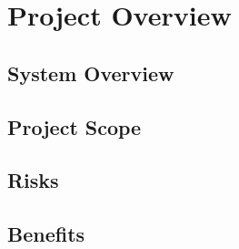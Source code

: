 

\setcounter{section}{1}
\section{Project Overview}
\bigskip

\subsection{System Overview}

\subsection{Project Scope}

\subsection{Risks}

\subsection{Benefits}